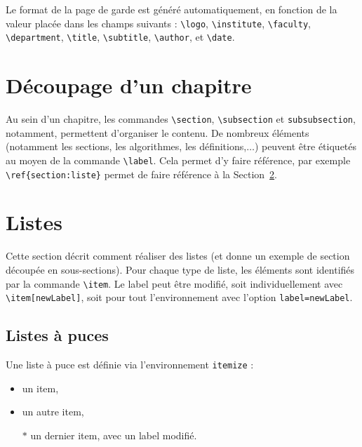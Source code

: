 \documentclass[a4paper, 12pt]{report}
\begin{document}
    
    Le format de la page de garde est généré automatiquement, en fonction de la valeur placée dans les champs suivants : \verb+\logo+, \verb+\institute+, \verb+\faculty+, \verb+\department+, \verb+\title+, \verb+\subtitle+, \verb+\author+, et \verb+\date+.

   
    
    \section{Découpage d'un chapitre}
    Au sein d'un chapitre, les commandes \verb+\section+, \verb+\subsection+ et \verb+subsubsection+, notamment, permettent d'organiser le contenu. De nombreux éléments (notamment les sections, les algorithmes, les définitions,$\dots$) peuvent être étiquetés au moyen de la commande \verb+\label+. Cela permet d'y faire référence, par exemple \verb+\ref{section:liste}+ permet de faire référence à la Section~\ref{section:liste}.
    
    \section{Listes}\label{section:liste}
    Cette section décrit comment réaliser des listes (et donne un exemple de section découpée en sous-sections). Pour chaque type de liste, les éléments sont identifiés par la commande \verb+\item+. Le label peut être modifié, soit individuellement avec \verb+\item[newLabel]+, soit pour tout l'environnement avec l'option \verb+label=newLabel+.
    
    
    \subsection{Listes à puces}
    Une liste à puce est définie via l'environnement \verb+itemize+ :
    \begin{itemize}
        \item un item,
        \item un autre item,
        \item[$*$] un dernier item, avec un label modifié.
    \end{itemize}
    
\end{document}
